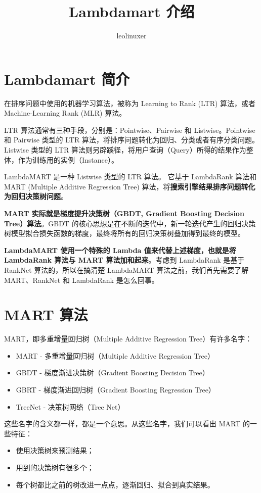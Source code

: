\documentclass[12pt]{article}
\title{Lambdamart 介绍\cite{A_Not_So_Simple_Introduction_To_Lambdamart}}
\author{leolinuxer}
\begin{document}
\maketitle
\tableofcontents

\section{Lambdamart 简介}
在排序问题中使用的机器学习算法，被称为 Learning to Rank (LTR) 算法，或者 Machine-Learning Rank (MLR) 算法。

LTR 算法通常有三种手段，分别是：Pointwise、Pairwise 和 Listwise。Pointwise 和 Pairwise 类型的 LTR 算法，将排序问题转化为回归、分类或者有序分类问题。Listwise 类型的 LTR 算法则另辟蹊径，将用户查询（Query）所得的结果作为整体，作为训练用的实例（Instance）。

LambdaMART 是一种 Listwise 类型的 LTR 算法。
它基于 LambdaRank 算法和 MART (Multiple Additive Regression Tree) 算法，将\textbf{搜索引擎结果排序问题转化为回归决策树问题}。

\textbf{MART 实际就是梯度提升决策树（GBDT, Gradient Boosting Decision Tree）算法}。GBDT 的核心思想是在不断的迭代中，新一轮迭代产生的回归决策树模型拟合损失函数的梯度，最终将所有的回归决策树叠加得到最终的模型。

\textbf{LambdaMART 使用一个特殊的 Lambda 值来代替上述梯度，也就是将 LambdaRank 算法与 MART 算法加和起来}。考虑到 LambdaRank 是基于 RankNet 算法的，所以在搞清楚 LambdaMART 算法之前，我们首先需要了解 MART、RankNet 和 LambdaRank 是怎么回事。

\section{MART 算法}
MART，即多重增量回归树（Multiple Additive Regression Tree）有许多名字：
\begin{itemize}
\setlength{\itemsep}{0pt}
\setlength{\parsep}{0pt}
\setlength{\parskip}{0pt}
    \item MART - 多重增量回归树（Multiple Additive Regression Tree）
    \item GBDT - 梯度渐进决策树（Gradient Boosting Decision Tree）
    \item GBRT - 梯度渐进回归树（Gradient Boosting Regression Tree）
    \item TreeNet - 决策树网络（Tree Net）
\end{itemize}

这些名字的含义都一样，都是一个意思。从这些名字，我们可以看出 MART 的一些特征：
\begin{itemize}
\setlength{\itemsep}{0pt}
\setlength{\parsep}{0pt}
\setlength{\parskip}{0pt}
    \item 使用决策树来预测结果；
    \item 用到的决策树有很多个；
    \item 每个树都比之前的树改进一点点，逐渐回归、拟合到真实结果。
\end{itemize}
\end{document}

